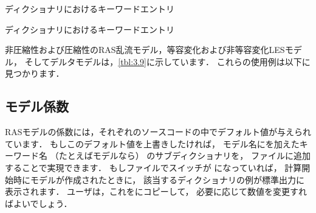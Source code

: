 \begin{table}[ht]
 
 \caption{ディクショナリにおけるキーワードエントリ}
 \label{tbl:7.4}
\end{table}


\begin{table}[ht]
 
 \caption{ディクショナリにおけるキーワードエントリ}
 \label{tbl:7.5}
\end{table}


非圧縮性および圧縮性のRAS乱流モデル，等容変化および非等容変化LESモデル，
そしてデルタモデルは，\autoref{tbl:3.9}に示しています．
これらの使用例は以下に見つかります．


\subsection{モデル係数}
\label{ssec:7.2.1}
RASモデルの係数には，それぞれのソースコードの中でデフォルト値が与えられています．
もしこのデフォルト値を上書きしたければ，
モデル名にを加えたキーワード名
（たとえばモデルなら）
のサブディクショナリを，
ファイルに追加することで実現できます．
もしファイルでスイッチが
になっていれば，
計算開始時にモデルが作成されたときに，
該当するディクショナリの例が標準出力に表示されます．
ユーザは，これをにコピーして，
必要に応じて数値を変更すればよいでしょう．


